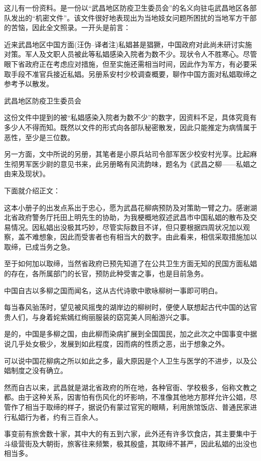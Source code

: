 \documentclass[12pt,UTF8]{ctexbook}
\begin{document}
这儿有一份资料。是一份以“武昌地区防疫卫生委员会”的名义向驻屯武昌地区各部队发出的“机密文件”。该文件很好地表现出为当地妓女问题所困扰的当地军方干部的苦恼，因此全文照录。一开头是前言：

近来武昌地区中国方面(汪伪--译者注)私娼甚是猖獗，中国政府对此尚未研讨实施对策。军人及文职人员被此等私娼感染入院者为数不少。现状令人不胜寒心。尽管眼下省政府正在考虑应对措施，但至实施还需相当时间，因此作为军方，有必要采取手段不准官兵接近私娼。另册系安村少校调查概要，聊作中国方面对私娼取缔之参考予以散发。

武昌地区防疫卫生委员会

这份文件中提到的被“私娼感染入院者为数不少”的数字，因资料不足，具体究竟有多少人不得而知。既然以文件的形式向各部队秘密散发，因此只能推定为病情属于恶性，至少是三位数。

另一方面，文中所说的另册，其笔者是小原兵站司令部军医少校安村光享。比起麻生彻男军医少尉的意见书来，此另册略有风流韵味，题名为《武昌之柳——私娼之由来及现状》。

下面就介绍正文：

这本小册子的出发点系出于忠心，愿为武昌花柳病预防及对策助一臂之力。感谢湖北省政府警务厅托田上明先生的协助，为我梗概地叙述武昌市中国私娼的散布及交易情况。因私娼出没极其巧妙，尽管实际数目不详，但只要根据四周状况加以观察，盖不难想象，因此而受害者也有相当大的数字。由此看来，相信采取措施加以取缔，已成当务之急。

至于如何加以取缔，当然省政府已预先知道了在公共卫生方面无知的民国方面私娼的存在，各所属部门的长官，预防此种受害之事，也是目前急务。

中国自古以多柳之国而闻名，这从古代诗歌中歌咏柳树一事即可明白。

每当春风骀荡时，望见被风摇曳的湖岸边的柳树时，便使人联想起古代中国的达官贵人们，与身着姹紫嫣红绚丽服装的窈窕美人同船游兴之事。

是的，中国是多柳之国，由此柳而染病扩展到全国国民，加之此次之中国事变中据说几乎处女极少，发展到如此程度，因而病的性质之恶，出于想象之外。

可以说中国花柳病之所以如此之多，最大原因是个人卫生与医学的不进步，以及公娼制度之没有确立。

然而自古以来，武昌就是湖北省政府的所在地，各种官衙、学校极多，俗称文教之都。由于这种关系，因害怕有伤风化的坏影响，不准像其他地方那样允许公娼，尽管作了相当于取缔的样子，据说仍有蒙过官宪的眼睛，利用旅馆饭店、普通民家进行私娼行为者，约有三百余人。

事变前有旅舍数十家，其中大的有五到六家，此外还有许多饮食店，其主要集中于斗级营街及大朝街，旅客往来频繁，极其殷盛，其取缔不甚严，因此私娼的出没也相当多。
\end{document}
